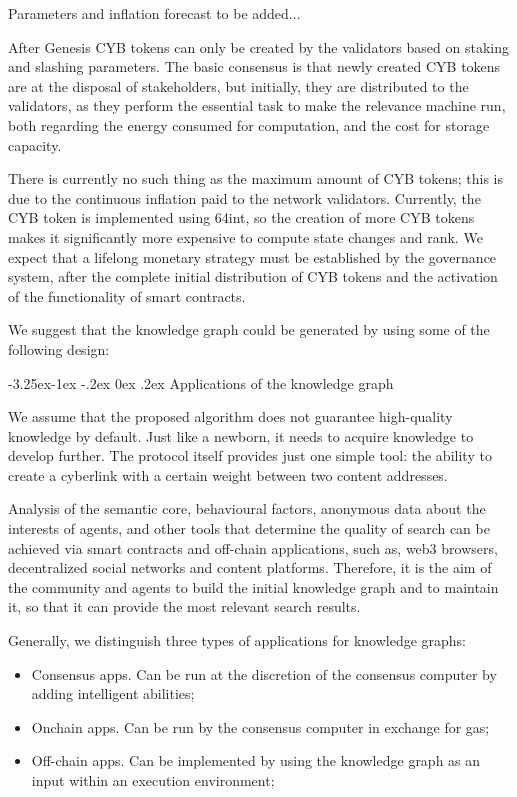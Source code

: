 \documentclass[8pt,oneside]{amsart}
\makeatletter
\renewcommand\subsection{\@startsection{subsection}{2}{\z@}%
                                     {-3.25ex\@plus -1ex \@minus -.2ex}%
                                     {0ex \@plus .2ex}%
                                     {\play\Large}}%
\newcommand{\titleSection}[1]{\subsection{#1}}
\newenvironment{Figure}
  {\par\medskip\noindent\minipage{\linewidth}}
  {\endminipage\par\medskip}
\makeatother
\begin{document}
\begin{Abstract}
\begin{itemize}
\end{itemize}

\begin{Figure}
 \centering
 
\end{Figure}

Parameters and inflation forecast to be added...

After Genesis CYB tokens can only be created by the validators based on staking and slashing parameters. The basic consensus is that newly created CYB tokens are at the disposal of stakeholders, but initially, they are distributed to the validators, as they perform the essential task to make the relevance machine run, both regarding the energy consumed for computation, and the cost for storage capacity.

There is currently no such thing as the maximum amount of CYB tokens; this is due to the continuous inflation paid to the network validators. Currently, the CYB token is implemented using 64int, so the creation of more CYB tokens makes it significantly more expensive to compute state changes and rank. We expect that a lifelong monetary strategy must be established by the governance system, after the complete initial distribution of CYB tokens and the activation of the functionality of smart contracts.

We suggest that the knowledge graph could be generated by using some of the following design:

\titleSection{Applications of the knowledge graph}\label{Applications of the knowledge graph}

We assume that the proposed algorithm does not guarantee high-quality knowledge by default. Just like a newborn, it needs to acquire knowledge to develop further. The protocol itself provides just one simple tool: the ability to create a cyberlink with a certain weight between two content addresses.

Analysis of the semantic core, behavioural factors, anonymous data about the interests of agents, and other tools that determine the quality of search can be achieved via smart contracts and off-chain applications, such as, web3 browsers, decentralized social networks and content platforms. Therefore, it is the aim of the community and agents to build the initial knowledge graph and to maintain it, so that it can provide the most relevant search results.

Generally, we distinguish three types of applications for knowledge graphs:
\begin{itemize}
\item Consensus apps. Can be run at the discretion of the consensus computer by adding intelligent abilities;
\item Onchain apps. Can be run by the consensus computer in exchange for gas;
\item Off-chain apps. Can be implemented by using the knowledge graph as an input within an execution environment;
\end{itemize}


\end{Abstract}
\end{document}
